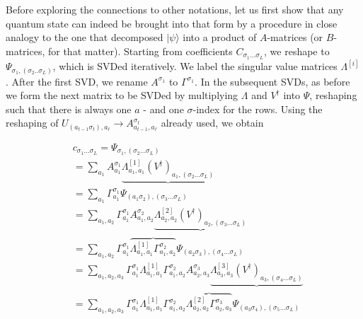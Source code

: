 \documentclass[12pt]{article}
\begin{document}
Before exploring the connections to other notations, let us first show that any quantum state can indeed be brought into that form by a procedure in close analogy to the one that decomposed $|\psi\rangle$ into a product of $A$-matrices (or $B$-matrices, for that matter). Starting from coefficients $C_{\sigma_{1} \ldots \sigma_{L}}$, we reshape to $\Psi_{\sigma_{1},\left(\sigma_{2} . . \sigma_{L}\right)}$, which is SVDed iteratively. We label the singular value matrices $\Lambda^{[i]}$. After the first SVD, we rename $A^{\sigma_{1}}$ to $\Gamma^{\sigma_{1}}$. In the subsequent SVDs, as before we form the next matrix to be SVDed by multiplying $\Lambda$ and $V^{\dagger}$ into $\Psi$, reshaping such that there is always one $a$ - and one $\sigma$-index for the rows. Using the reshaping of $U_{\left(a_{t-1} \sigma_{t}\right), a_{\ell}} \rightarrow A_{a_{t-1}, a_{\ell}}^{\sigma_{t}}$ already used, we obtain

$$
\begin{aligned}
& c_{\sigma_{1} \ldots \sigma_{L}}=\Psi_{\sigma_{1},\left(\sigma_{2} \ldots \sigma_{L}\right)} \\
& =\sum_{a_{1}} A_{a_{1}}^{\sigma_{1}} \underbrace{\Lambda_{a_{1}, a_{1}}^{[1]}\left(V^{\dagger}\right)_{a_{1},\left(\sigma_{2} \ldots \sigma_{L}\right)}} \\
& =\sum_{a_{1}} \Gamma_{a_{1}}^{\sigma_{1}} \Psi_{\left(a_{1} \sigma_{2}\right),\left(\sigma_{3} \ldots \sigma_{L}\right)} \\
& =\sum_{a_{1}, a_{2}} \Gamma_{a_{1}}^{\sigma_{1}} A_{a_{1}, a_{2}}^{\sigma_{2}} \underbrace{\Lambda_{a_{2}, a_{2}}^{[2]}\left(V^{\dagger}\right)_{a_{2},\left(\sigma_{3} \ldots \sigma_{L}\right)}} \\
& =\sum_{a_{1}, a_{2}} \Gamma_{a_{1}}^{\sigma_{1}} \overbrace{\Lambda_{a_{1}, a_{1}}^{[1]} \Gamma_{a_{1}, a_{2}}^{\sigma_{2}}} \Psi_{\left(a_{2} \sigma_{3}\right),\left(\sigma_{4} \ldots \sigma_{L}\right)} \\
& =\sum_{a_{1}, a_{2}, a_{3}} \Gamma_{a_{1}}^{\sigma_{1}} \Lambda_{a_{1}, a_{1}}^{[1]} \Gamma_{a_{1}, a_{2}}^{\sigma_{2}} A_{a_{2}, a_{3}}^{\sigma_{3}} \underbrace{\Lambda_{a_{3}, a_{3}}^{[3]}\left(V^{\dagger}\right)_{a_{3},\left(\sigma_{4} \ldots \sigma_{L}\right)}} \\
& =\sum_{a_{1}, a_{2}, a_{3}} \Gamma_{a_{1}}^{\sigma_{1}} \Lambda_{a_{1}, a_{1}}^{[1]} \Gamma_{a_{1}, a_{2}}^{\sigma_{2}} \overbrace{\Lambda_{a_{2}, a_{2}}^{[2]} \Gamma_{a_{2}, a_{3}}^{\sigma_{3}}} \Psi_{\left(a_{3} \sigma_{4}\right),\left(\sigma_{5} \ldots \sigma_{L}\right)}
\end{aligned}
$$
\end{document}
